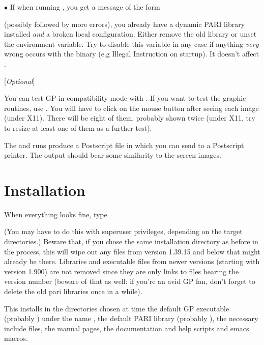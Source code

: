 $\bullet$ If when running , you get a message of the form


\noindent (possibly followed by more errors), you already have a dynamic PARI
library installed {\it and\/} a broken local configuration. Either remove the
old library or unset the  environment variable. Try to
disable this variable in any case if anything {\it very} wrong occurs with
the  binary (e.g Illegal Instruction on startup). It doesn't
affect .

 [{\sl Optional\/}]

You can test GP in compatibility mode with . If you
want to test the graphic routines, use . You will
have to click on the mouse button after seeing each image (under X11).
There will be eight of them, probably shown twice (under X11, try to resize
at least one of them as a further test).

The  and  runs produce a Postscript
file  in  which you can send to a Postscript
printer. The output should bear some similarity to the screen images.

\section{Installation} When everything looks fine, type


\noindent (You may have to do this with superuser privileges, depending on
the target directories.) Beware that, if you chose the same installation
directory as before in the  process, this will wipe out any
files from version 1.39.15 and below that might already be there. Libraries
and executable files from newer versions (starting with version 1.900) are
not removed since they are only links to files bearing the version number
(beware of that as well: if you're an avid GP fan, don't forget to delete the
old pari libraries once in a while).

This installs in the directories chosen at  time the default
GP executable (probably ) under the name , the default
PARI library (probably ), the necessary include files, the
manual pages, the documentation and help scripts and emacs macros.

